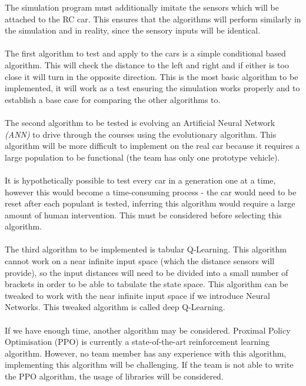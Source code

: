 \documentclass[8pt]{article}
\begin{document}
%
%
%
The simulation program must additionally imitate the sensors which will be attached to the RC car. This ensures that the algorithms will perform similarly in the simulation and in reality, since the sensory inputs will be identical.
\\\\
The first algorithm to test and apply to the cars is a simple conditional based algorithm. This will check the distance to the left and right and if either is too close it will turn in the opposite direction. This is the most basic algorithm to be implemented, it will work as a test ensuring the simulation works properly and to establish a base case for comparing the other algorithms to.
\\\\
The second algorithm to be tested is evolving an Artificial Neural Network \emph{(ANN)} to drive through the courses using the evolutionary algorithm. This algorithm will be more difficult to implement on the real car because it requires a large population to be functional (the team has only one prototype vehicle). 
\\\\
It is hypothetically possible to test every car in a generation one at a time, however this would become a time-consuming process - the car would need to be reset after each populant is tested, inferring this algorithm would require a large amount of human intervention. This must be considered before selecting this algorithm.
\\\\
The third algorithm to be implemented is tabular Q-Learning. This algorithm cannot work on a near infinite input space (which the distance sensors will provide), so the input distances will need to be divided into a small number of brackets in order to be able to tabulate the state space. This algorithm can be tweaked to work with the near infinite input space if we introduce Neural Networks. This tweaked algorithm is called deep Q-Learning.
\\\\
If we have enough time, another algorithm may be considered. Proximal Policy Optimisation (PPO) is currently a state-of-the-art reinforcement learning algorithm. However, no team member has any experience with this algorithm, implementing this algorithm will be challenging. If the team is not able to write the PPO algorithm, the usage of libraries will be considered.
\end{document}
